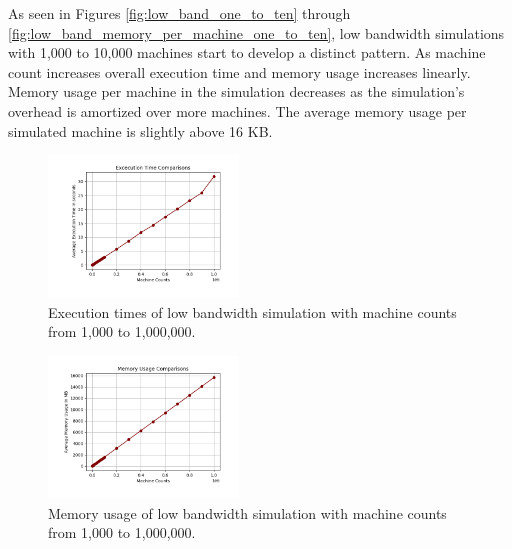 \documentclass[journal]{IEEEtran} %
\newcommand{\imagewidth}{0.45\textwidth}
\begin{document}
As seen in Figures \ref{fig:low_band_one_to_ten} through \ref{fig:low_band_memory_per_machine_one_to_ten}, low bandwidth simulations with 1,000 to 10,000 machines start to develop a distinct pattern. As machine count increases overall execution time and memory usage increases linearly. Memory usage per machine in the simulation decreases as the simulation's overhead is amortized over more machines. The average memory usage per simulated machine is slightly above 16 KB.

\begin{figure}[H]
    \centerline{\includegraphics[width=\imagewidth]{Images/time_low_band_thousand_to_million.png}}
    \caption{Execution times of low bandwidth simulation with machine counts from 1,000 to 1,000,000.}
    \label{fig:low_band_one_to_million}
\end{figure}

\begin{figure}[H]
    \centerline{\includegraphics[width=\imagewidth]{Images/mem_usage_low_band.png}}
    \caption{Memory usage of low bandwidth simulation with machine counts from 1,000 to 1,000,000.}
    \label{fig:low_band_memory_one_to_million}
\end{figure}
\end{document}
